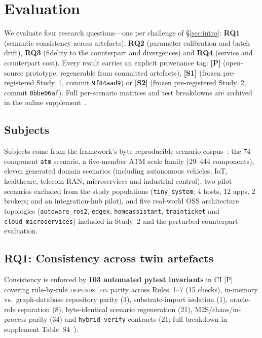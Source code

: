 \section{Evaluation}
\label{sec:evaluation}

We evaluate four research questions---one per challenge of \S\ref{sec:intro}: \textbf{RQ1} (semantic consistency across artefacts), \textbf{RQ2} (parameter calibration and batch drift), \textbf{RQ3} (fidelity to the counterpart and divergences) and \textbf{RQ4} (service and counterpart cost). Every result carries an explicit provenance tag: \textbf{[P]} (open-source prototype, regenerable from committed artefacts), \textbf{[S1]} (frozen pre-registered Study~1, commit \texttt{9f84aad9}) or \textbf{[S2]} (frozen pre-registered Study~2, commit \texttt{0bbe06af}). Full per-scenario matrices and test breakdowns are archived in the online supplement~\citep{sag-software}.

\subsection{Subjects}

Subjects come from the framework's byte-reproducible scenario corpus~\citep{sag-software}: the 74-component \texttt{atm} scenario, a five-member ATM scale family (29--444 components), eleven generated domain scenarios (including autonomous vehicles, IoT, healthcare, telecom RAN, microservices and industrial control), two pilot scenarios excluded from the study populations (\texttt{tiny\_system}: 4 hosts, 12 apps, 2 brokers; and an integration-hub pilot), and five real-world OSS architecture topologies (\texttt{autoware\_ros2}, \texttt{edgex}, \texttt{homeassistant}, \texttt{trainticket} and \texttt{cloud\_microservices}) included in Study~2 and the perturbed-counterpart evaluation.

\subsection{RQ1: Consistency across twin artefacts}
\label{sec:consistency}

Consistency is enforced by \textbf{103 automated pytest invariants} in CI [P] covering rule-by-rule \textsc{depends\_on} parity across Rules~1--7 (15 checks), in-memory vs.\ graph-database repository parity (3), substrate-import isolation (1), oracle-role separation (8), byte-identical scenario regeneration (21), M2S/chaos/in-process parity (34) and \texttt{hybrid-verify} contracts (21; full breakdown in supplement Table~S4~\citealp{sag-software}).

